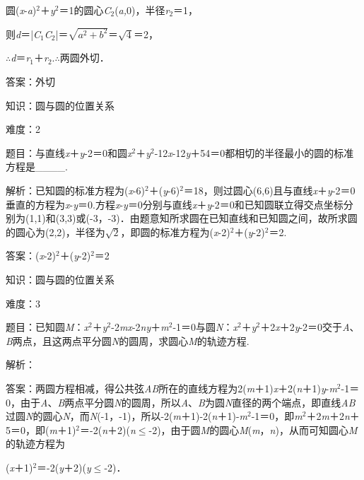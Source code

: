 \documentclass{article} %
\begin{document}
圆(\textit{x}-\textit{a})${}^{2}$＋\textit{y}${}^{2}$＝1的圆心\textit{C}${}_{2}$(\textit{a,}0)，半径\textit{r}${}_{2}$＝1，

则\textit{d}＝|\textit{C}${}_{1}$\textit{C}${}_{2}$|＝$\sqrt{a^2+b^2}$＝$\sqrt{4}$＝2，

$\mathrm{\therefore}$\textit{d}＝\textit{r}${}_{1}$＋\textit{r}${}_{2}$.$\mathrm{\therefore}$两圆外切．

答案：外切

知识：圆与圆的位置关系

难度：2

题目：与直线\textit{x}＋\textit{y}-2＝0和圆\textit{x}${}^{2}$＋\textit{y}${}^{2}$-12\textit{x}-12\textit{y}＋54＝0都相切的半径最小的圆的标准方程是\_\_\_\_.

解析：已知圆的标准方程为(\textit{x}-6)${}^{2}$＋(\textit{y}-6)${}^{2}$＝18，则过圆心(6,6)且与直线\textit{x}＋\textit{y}-2＝0垂直的方程为\textit{x}-\textit{y}＝0.方程\textit{x}-\textit{y}＝0分别与直线\textit{x}＋\textit{y}-2＝0和已知圆联立得交点坐标分别为(1,1)和(3,3)或(-3，-3)．由题意知所求圆在已知直线和已知圆之间，故所求圆的圆心为(2,2)，半径为$\sqrt{2}$，即圆的标准方程为(\textit{x}-2)${}^{2}$＋(\textit{y}-2)${}^{2}$＝2.

答案：(\textit{x}-2)${}^{2}$＋(\textit{y}-2)${}^{2}$＝2

知识：圆与圆的位置关系

难度：3

题目：已知圆\textit{M}：\textit{x}${}^{2}$＋\textit{y}${}^{2}$-2\textit{mx}-2\textit{ny}＋\textit{m}${}^{2}$-1＝0与圆\textit{N}：\textit{x}${}^{2}$＋\textit{y}${}^{2}$＋2\textit{x}＋2\textit{y}-2＝0交于\textit{A}、\textit{B}两点，且这两点平分圆\textit{N}的圆周，求圆心\textit{M}的轨迹方程.

解析：

答案：两圆方程相减，得公共弦\textit{AB}所在的直线方程为2(\textit{m}＋1)\textit{x}＋2(\textit{n}＋1)\textit{y}-\textit{m}${}^{2}$-1＝0，由于\textit{A}、\textit{B}两点平分圆\textit{N}的圆周，所以\textit{A}、\textit{B}为圆\textit{N}直径的两个端点，即直线\textit{AB}过圆\textit{N}的圆心\textit{N}，而\textit{N}(-1，-1)，所以-2(\textit{m}＋1)-2(\textit{n}＋1)-\textit{m}${}^{2}$-1＝0，即\textit{m}${}^{2}$＋2\textit{m}＋2\textit{n}＋5＝0，即(\textit{m}＋1)${}^{2}$＝-2(\textit{n}＋2)(\textit{n}$\mathrm{\le}$-2)，由于圆\textit{M}的圆心\textit{M}(\textit{m}，\textit{n})，从而可知圆心\textit{M}的轨迹方程为

(\textit{x}＋1)${}^{2}$＝-2(\textit{y}＋2)(\textit{y}$\mathrm{\le}$-2)．
\end{document}
